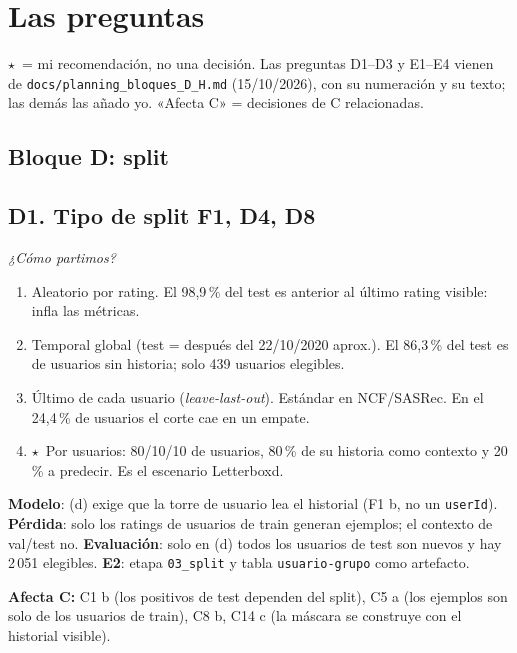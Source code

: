 \documentclass[a4paper,11pt]{article}
\newcommand{\rec}{\ensuremath{\star}}
\begin{document}
\section{Las preguntas}
\rec\ = mi recomendación, no una decisión. Las preguntas D1--D3 y E1--E4 vienen de \texttt{docs/\allowbreak planning\_\allowbreak bloques\_\allowbreak D\_H.md}
(15/10/2026), con su numeración y su texto; las demás las añado yo. «Afecta C» = decisiones de C relacionadas.

\newcommand{\preg}[3]{\subsection*{#1 \normalfont\small\hfill #3}\textit{#2}\par}
\newcommand{\afecta}[1]{\par\smallskip\noindent\textbf{Afecta C:} #1\par}

\subsection*{\large Bloque D: split}

\preg{D1. Tipo de split}{¿Cómo partimos?}{F1, D4, D8}
\begin{enumerate}[label=\alph*)]
  \item Aleatorio por rating. El 98,9\,\% del test es anterior al último rating visible: infla las métricas.
  \item Temporal global (test = después del 22/10/2020 aprox.). El 86,3\,\% del test es de usuarios sin historia; solo 439 usuarios elegibles.
  \item Último de cada usuario (\emph{leave-last-out}). Estándar en NCF/SASRec. En el 24,4\,\% de usuarios el corte cae en un empate.
  \item \rec\ Por usuarios: 80/10/10 de usuarios, 80\,\% de su historia como contexto y 20\,\% a predecir. Es el escenario Letterboxd.
\end{enumerate}
\textbf{Modelo}: (d) exige que la torre de usuario lea el historial (F1 b, no un \texttt{userId}). \textbf{Pérdida}: solo los ratings de usuarios
de train generan ejemplos; el contexto de val/test no. \textbf{Evaluación}: solo en (d) todos los usuarios de test son nuevos y hay
2\,051 elegibles. \textbf{E2}: etapa \texttt{03\_split} y tabla \texttt{usuario-grupo} como artefacto.
\afecta{C1 b (los positivos de test dependen del split), C5 a (los ejemplos son solo de los usuarios de train), C8 b, C14 c (la máscara se construye con el historial visible).}
\end{document}
